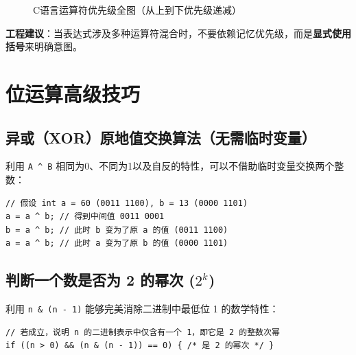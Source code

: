 \begin{figure}[H]
\caption{C语言运算符优先级全图（从上到下优先级递减）}
\label{fig:operator_priority}
\end{figure}

\textbf{工程建议}：当表达式涉及多种运算符混合时，不要依赖记忆优先级，而是\textbf{显式使用括号}来明确意图。

\section{位运算高级技巧}

\subsection{异或（XOR）原地值交换算法（无需临时变量）}

利用 \texttt{A \textasciicircum{} B} 相同为0、不同为1以及自反的特性，可以不借助临时变量交换两个整数：

\begin{lstlisting}[caption={XOR 交换算法}]
// 假设 int a = 60 (0011 1100), b = 13 (0000 1101)
a = a ^ b; // 得到中间值 0011 0001
b = a ^ b; // 此时 b 变为了原 a 的值 (0011 1100)
a = a ^ b; // 此时 a 变为了原 b 的值 (0000 1101)
\end{lstlisting}

\subsection{判断一个数是否为 2 的幂次 ($2^k$)}

利用 \texttt{n \& (n - 1)} 能够完美消除二进制中最低位 1 的数学特性：

\begin{lstlisting}[caption={2 的幂次判定}]
// 若成立，说明 n 的二进制表示中仅含有一个 1，即它是 2 的整数次幂
if ((n > 0) && (n & (n - 1)) == 0) { /* 是 2 的幂次 */ }
\end{lstlisting}

